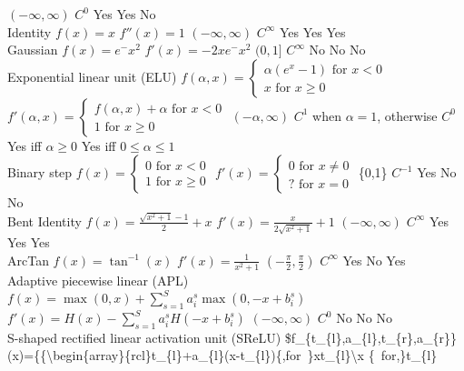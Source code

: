 \documentclass[]{book}
\begin{document}
\textbar{} \((-\infty, \infty)\) \textbar{} \(C^0\) \textbar{} Yes
\textbar{} Yes \textbar{} No \textbar{}\\
Identity \textbar{} \textbar{} \(f(x) = x\) \textbar{} \(f''(x) = 1\)
\textbar{} \((-\infty, \infty)\) \textbar{} \(C^\infty\) \textbar{} Yes
\textbar{} Yes \textbar{} Yes \textbar{}\\
Gaussian \textbar{} \textbar{} \(f(x)=e^-x^2\) \textbar{}
\(f'(x) = -2xe^-x^2\) \textbar{} \((0,1]\) \textbar{} \(C^\infty\)
\textbar{} No \textbar{} No \textbar{} No \textbar{}\\
Exponential linear unit (ELU) \textbar{} \textbar{}
\(f(\alpha ,x)=\left\{{\begin{array}{rcl}\alpha (e^{x}-1){\mbox{ for }}x<0\\x{\mbox{ for }}x\geq 0\end{array}}\right.\)
\textbar{}
\(f'(\alpha ,x)=\left\{{\begin{array}{rcl}f(\alpha ,x)+\alpha {\mbox{ for }}x<0\\1{\mbox{ for }}x\geq 0\end{array}}\right.\)
\textbar{} \((-\alpha,\infty)\) \textbar{} \(C^1\) when \(\alpha = 1\),
otherwise \(C^0\) \textbar{} Yes iff \(\alpha \geq 0\) \textbar{} Yes
iff \(0 \leq \alpha \leq 1\) \textbar{} \textbar{}\\
Binary step \textbar{} \textbar{}
\(\displaystyle f(x)=\left\{{\begin{array}{rcl}0{\mbox{ for }}x <0\\1{\mbox{ for }}x\geq 0\end{array}}\right.\)
\textbar{}
\(\displaystyle f'(x)=\left\{{\begin{array}{rcl}0{\mbox{ for }}x\neq 0\\?{\mbox{ for }}x=0\end{array}}\right.\)
\textbar{} \{0,1\} \textbar{} \(C^{-1}\) \textbar{} Yes \textbar{} No
\textbar{} No \textbar{}\\
Bent Identity \textbar{} \textbar{}
\(f(x)={\frac {{\sqrt {x^{2}+1}}-1}{2}}+x\) \textbar{}
\(f'(x)={\frac {x}{2{\sqrt {x^{2}+1}}}}+1\) \textbar{}
\((-\infty, \infty)\) \textbar{} \(C^\infty\) \textbar{} Yes \textbar{}
Yes \textbar{} Yes \textbar{}\\
ArcTan \textbar{} \textbar{} \(f(x)=\tan ^{-1}(x)\) \textbar{}
\(f'(x)={\frac {1}{x^{2}+1}}\) \textbar{}
\(\left ( -\frac{\pi}{2},\frac{\pi}{2} \right )\) \textbar{}
\(C^\infty\) \textbar{} Yes \textbar{} No \textbar{} Yes \textbar{}\\
Adaptive piecewise linear (APL) \textbar{} \textbar{}
\(\displaystyle f(x)=\max(0,x)+\sum _{s=1}^{S}a_{i}^{s}\max(0,-x+b_{i}^{s})\)
\textbar{}
\(\displaystyle f'(x)=H(x)-\sum _{s=1}^{S}a_{i}^{s}H(-x+b_{i}^{s})\)
\textbar{} \((-\infty, \infty)\) \textbar{} \(C^0\) \textbar{} No
\textbar{} No \textbar{} No \textbar{}\\
S-shaped rectified linear activation unit (SReLU) \textbar{} \textbar{}
\$f\_\{t\_\{l\},a\_\{l\},t\_\{r\},a\_\{r\}\}(x)=\left\{\{\textbackslash{}begin\{array\}\{rcl\}t\_\{l\}+a\_\{l\}(x-t\_\{l\})\{\mbox{,for }\}x\leq t\_\{l\}\textbackslash{}x
\{\mbox{ for,}\}t\_\{l\} \textbar{} \textbar{} \textbar{} \textbar{}
\textbar{} \textbar{} \textbar{}


\end{document}
